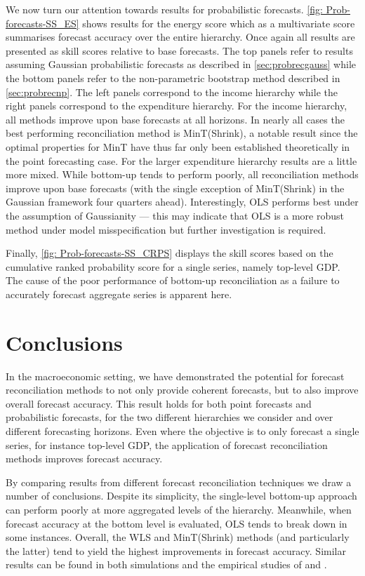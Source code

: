 {We now turn our attention towards results for probabilistic forecasts. \ref{fig: Prob-forecasts-SS_ES} shows results for the energy score which as a multivariate score summarises forecast accuracy over the entire hierarchy. Once again all results are presented as skill scores relative to base forecasts. The top panels refer to results assuming Gaussian probabilistic forecasts as described in \ref{sec:probrecgauss} while the bottom panels refer to the non-parametric bootstrap method described in \ref{sec:probrecnp}. The left panels correspond to the income hierarchy while the right panels correspond to the expenditure hierarchy. For the income hierarchy, all methods improve upon base forecasts at all horizons. In nearly all cases the best performing reconciliation method is MinT(Shrink), a notable result since the optimal properties for MinT have thus far only been established theoretically in the point forecasting case. For the larger expenditure hierarchy results are a little more mixed. While bottom-up tends to perform poorly, all reconciliation methods improve upon base forecasts (with the single exception of MinT(Shrink) in the Gaussian framework four quarters ahead). Interestingly, OLS performs best under the assumption of Gaussianity --- this may indicate that OLS is a more robust method under model misspecification but further investigation is required.

Finally, \ref{fig: Prob-forecasts-SS_CRPS} displays the skill scores based on the cumulative ranked probability score for a single series, namely top-level GDP\@. The cause of the poor performance of bottom-up reconciliation as a failure to accurately forecast aggregate series is apparent here.

\section{Conclusions}\label{sec:conclusions}

In the macroeconomic setting, we have demonstrated the potential for forecast reconciliation methods to not only provide coherent forecasts, but to also improve overall forecast accuracy. This result holds for both point forecasts and probabilistic forecasts, for the two different hierarchies we consider and over different forecasting horizons. Even where the objective is to only forecast a single series, for instance top-level GDP, the application of forecast reconciliation methods improves forecast accuracy.

By comparing results from different forecast reconciliation techniques we draw a number of conclusions. Despite its simplicity, the single-level bottom-up approach can perform poorly at more aggregated levels of the hierarchy. Meanwhile, when forecast accuracy at the bottom level is evaluated, OLS tends to break down in some instances. Overall, the WLS and MinT(Shrink) methods (and particularly the latter) tend to yield the highest improvements in forecast accuracy. Similar results can be found in both simulations and the empirical studies of \citet{AthEtAl2017} and \citet{WicEtAl2019}.

}
